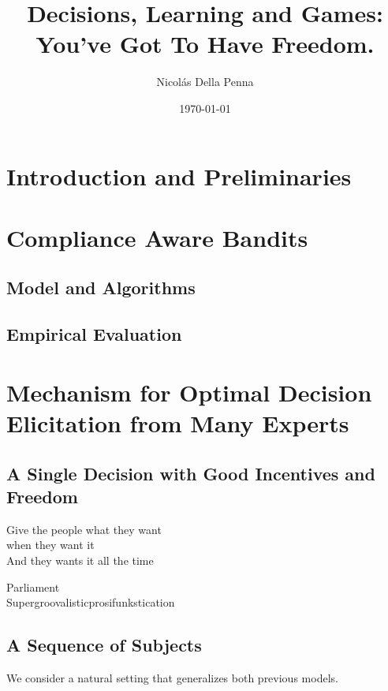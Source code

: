 \documentclass[11pt, a4paper]{book}
\title{Decisions, Learning and Games: \\ You've Got To Have Freedom.}
\author{Nicol\'as Della Penna}
\date{\today}
\begin{document}
\pagestyle{empty}
\thispagestyle{empty}



\cleardoublepage
\pagestyle{empty}


\cleardoublepage
\pagestyle{empty}


\cleardoublepage
\pagestyle{headings}


\cleardoublepage
\pagestyle{headings}
\tableofcontents
\listoffigures
\listoftables

\mainmatter
\part{Introduction and Preliminaries}




\part{Compliance Aware Bandits}

\chapter{Model and Algorithms}





\chapter{Empirical Evaluation}



\part{Mechanism for Optimal Decision Elicitation from Many Experts}

\chapter{A Single Decision with Good Incentives and Freedom}
\label{cha:market}
\epigraph{Give the people what they want\\ when they want it \\
And they wants it all the time}{Parliament \\ Supergroovalisticprosifunkstication}


\chapter{A Sequence of Subjects}
We consider a natural setting that generalizes both previous models.

\end{document}
